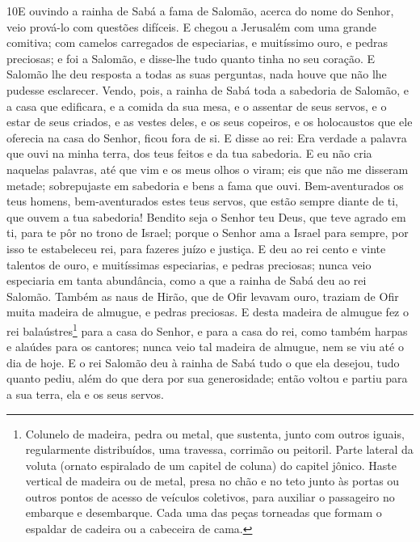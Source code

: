 \lettrine{10} E ouvindo a rainha de Sabá a fama de Salomão,
acerca do nome do Senhor, veio prová-lo com questões difíceis. E
chegou a Jerusalém com uma grande comitiva; com camelos carregados
de especiarias, e muitíssimo ouro, e pedras preciosas; e foi a
Salomão, e disse-lhe tudo quanto tinha no seu coração. E Salomão
lhe deu resposta a todas as suas perguntas, nada houve que não lhe
pudesse esclarecer. Vendo, pois, a rainha de Sabá toda a
sabedoria de Salomão, e a casa que edificara, e a comida da sua
mesa, e o assentar de seus servos, e o estar de seus criados, e as
vestes deles, e os seus copeiros, e os holocaustos que ele oferecia
na casa do Senhor, ficou fora de si. E disse ao rei: Era verdade
a palavra que ouvi na minha terra, dos teus feitos e da tua
sabedoria. E eu não cria naquelas palavras, até que vim e os
meus olhos o viram; eis que não me disseram metade; sobrepujaste em
sabedoria e bens a fama que ouvi. Bem-aventurados os teus
homens, bem-aventurados estes teus servos, que estão sempre diante
de ti, que ouvem a tua sabedoria! Bendito seja o Senhor teu
Deus, que teve agrado em ti, para te pôr no trono de Israel; porque
o Senhor ama a Israel para sempre, por isso te estabeleceu rei, para
fazeres juízo e justiça. E deu ao rei cento e vinte talentos
de ouro, e muitíssimas especiarias, e pedras preciosas; nunca veio
especiaria em tanta abundância, como a que a rainha de Sabá deu ao
rei Salomão. Também as naus de Hirão, que de Ofir levavam
ouro, traziam de Ofir muita madeira de almugue, e pedras preciosas.
E desta madeira de almugue fez o rei
balaústres\footnote{Colunelo de madeira, pedra ou metal, que
sustenta, junto com outros iguais, regularmente distribuídos, uma
travessa, corrimão ou peitoril. Parte lateral da voluta (ornato
espiralado de um capitel de coluna) do capitel jônico. Haste
vertical de madeira ou de metal, presa no chão e no teto junto às
portas ou outros pontos de acesso de veículos coletivos, para
auxiliar o passageiro no embarque e desembarque. Cada uma das peças
torneadas que formam o espaldar de cadeira ou a cabeceira de cama.}
para a casa do Senhor, e para a casa do rei, como também harpas e
alaúdes para os cantores; nunca veio tal madeira de almugue, nem se
viu até o dia de hoje. E o rei Salomão deu à rainha de Sabá
tudo o que ela desejou, tudo quanto pediu, além do que dera por sua
generosidade; então voltou e partiu para a sua terra, ela e os seus
servos.

